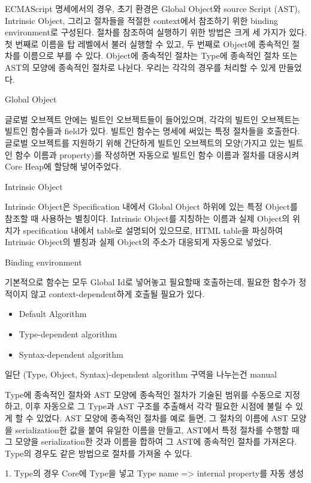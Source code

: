  ECMAScript 명세에서의 경우, 초기 환경은 Global Object와 source Script (AST), Intrinsic Object, 그리고 절차들을 적절한 context에서 참조하기 위한 binding environment로 구성된다. 절차를 참조하여 실행하기 위한 방법은 크게 세 가지가 있다. 첫 번째로 이름을 탑 레벨에서 불러 실행할 수 있고, 두 번째로 Object에 종속적인 절차를 이름으로 부를 수 있다. Object에 종속적인 절차는 Type에 종속적인 절차 또는 AST의 모양에 종속적인 절차로 나뉜다.
 우리는 각각의 경우를 처리할 수 있게 만들었다. 

 Global Object

 글로벌 오브젝트 안에는 빌트인 오브젝트들이 들어있으며, 각각의 빌트인 오브젝트는 빌트인 함수들과 field가 있다. 빌트인 함수는 명세에 써있는 특정 절차들을 호출한다. 글로벌 오브젝트를 지원하기 위해 간단하게 빌트인 오브젝트의 모양(가지고 있는 빌트인 함수 이름과 property)를 작성하면 자동으로 빌트인 함수 이름과 절차를 대응시켜 Core Heap에 할당해 넣어주었다.

 Intrinsic Object

 Intrinsic Object은 Specification 내에서 Global Object 하위에 있는 특정 Object를 참조할 때 사용하는 별칭이다. Intrinsic Object를 지칭하는 이름과 실제 Object의 위치가 specification 내에서 table로 설명되어 있으므로, HTML table을 파싱하여 Intrinsic Object의 별칭과 실제 Object의 주소가 대응되게 자동으로 넣었다. 

 Binding environment

기본적으로 함수는 모두 Global Id로 넣어놓고 필요할때 호출하는데, 필요한 함수가 정적이지 않고
context-dependent하게 호출될 필요가 있다.

 
\begin{itemize}
  \item Default Algorithm
  \item Type-dependent algorithm
  \item Syntax-dependent algorithm
  \end{itemize}
  

일단 (Type, Object, Syntax)-dependent algorithm 구역을 나누는건 manual

Type에 종속적인 절차와 AST 모양에 종속적인 절차가 기술된 범위를 수동으로 지정하고, 이후 자동으로 그 Type과 AST 구조를 추출해서 각각 필요한 시점에 불릴 수 있게 할 수 있었다. AST 모양에 종속적인 절차를 예로 들면, 그 절차의 이름에 AST 모양을 serialization한 값을 붙여 유일한 이름을 만들고, AST에서 특정 절차를 수행할 때 그 모양을 serialization한 것과 이름을 합하여 그 AST에 종속적인 절차를 가져온다. Type의 경우도 같은 방법으로 절차를 가져올 수 있다.

1. Type의 경우 Core에 Type을 넣고 Type name => internal property를 자동 생성

